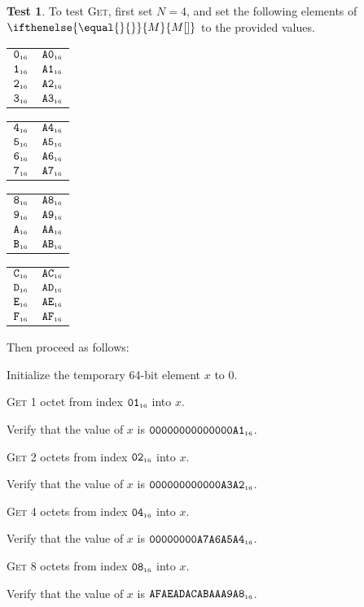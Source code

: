 \documentclass[a4paper,12pt]{article}
\makeatletter
\newcommand{\num}[1]{\texttt{#1}}
\newcommand{\hex}[1]{\num{#1}_{\textup{\tiny 16}}}
\newcommand{\MEM}[1]{\ifthenelse{\equal{#1}{}}{M}{M[#1]}}
\newcommand{\proc}[1]{\textsc{#1}}
\theoremstyle{definition}
\newtheorem{test}{Test}
\newenvironment{memtable}{%
  \begin{trivlist}
    \item
    }{%
    \end{trivlist}}
\newenvironment{memcolumn}{%
  \begin{tabular}{@{}ll@{}}
    \hline}
    {%
    \hline
  \end{tabular}}
\newcommand{\memspace}{\qquad}
\makeatother
\begin{document}
\begin{test}
  To test \proc{Get}, first set $N=4$, and set the following elements of $\MEM{}$ to the provided values.
  \begin{memtable}
    \begin{memcolumn}
      $\hex{0}$ & $\hex{A0}$ \\
      $\hex{1}$ & $\hex{A1}$ \\
      $\hex{2}$ & $\hex{A2}$ \\
      $\hex{3}$ & $\hex{A3}$ \\
    \end{memcolumn}
    \memspace
    \begin{memcolumn}
      $\hex{4}$ & $\hex{A4}$ \\
      $\hex{5}$ & $\hex{A5}$ \\
      $\hex{6}$ & $\hex{A6}$ \\
      $\hex{7}$ & $\hex{A7}$ \\
    \end{memcolumn}
    \memspace
    \begin{memcolumn}
      $\hex{8}$ & $\hex{A8}$ \\
      $\hex{9}$ & $\hex{A9}$ \\
      $\hex{A}$ & $\hex{AA}$ \\
      $\hex{B}$ & $\hex{AB}$ \\
    \end{memcolumn}
    \memspace
    \begin{memcolumn}
      $\hex{C}$ & $\hex{AC}$ \\
      $\hex{D}$ & $\hex{AD}$ \\
      $\hex{E}$ & $\hex{AE}$ \\
      $\hex{F}$ & $\hex{AF}$ \\
    \end{memcolumn}
  \end{memtable}
  Then proceed as follows:
  \begin{stepnumbers}
  \item Initialize the temporary 64-bit element $x$ to $0$.
  \item \proc{Get} 1 octet  from index $\hex{01}$ into $x$.
  \item Verify that the value of $x$ is $\hex{00000000000000A1}$.
  \item \proc{Get} 2 octets from index $\hex{02}$ into $x$.
  \item Verify that the value of $x$ is $\hex{000000000000A3A2}$.
  \item \proc{Get} 4 octets from index $\hex{04}$ into $x$.
  \item Verify that the value of $x$ is $\hex{00000000A7A6A5A4}$.
  \item \proc{Get} 8 octets from index $\hex{08}$ into $x$.
  \item Verify that the value of $x$ is $\hex{AFAEADACABAAA9A8}$.
  \end{stepnumbers}
\end{test}
\end{document}
